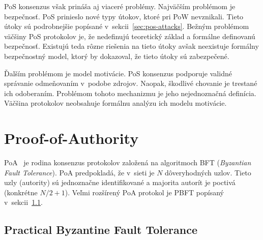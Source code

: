 PoS konsenzus však prináša aj viaceré problémy. Najväčším problémom je bezpečnosť. PoS prinieslo nové typy útokov, ktoré pri PoW nevznikali. Tieto útoky sú podrobnejšie popísané v~sekcii~\ref{sec:pos-attacks}. Bežným problémom väčšiny PoS protokolov je, že nedefinujú teoretický základ a formálne definovanú bezpečnosť. Existujú teda rôzne riešenia na tieto útoky avšak neexistuje formálny bezpečnostný model, ktorý by dokazoval, že tieto útoky sú zabezpečené.

Ďalším problémom je model motivácie. PoS konsenzus podporuje validné správanie odmeňovaním v~podobe zdrojov. Naopak, škodlivé chovanie je trestané ich odoberaním. Problémom tohoto mechanizmu je jeho nejednoznačná definícia. Väčšina protokolov neobsahuje formálnu analýzu ich modelu motivácie.~\cite{nguyenPos}

\section{Proof-of-Authority}

PoA~\cite{Angelis2018PBFTVP} je rodina konsenzus protokolov založená na algoritmoch BFT (\textit{Byzantian Fault Tolerance}). PoA predpokladá, že v~sieti je $N$ dôveryhodných uzlov. Tieto uzly (autority) sú jednoznačne identifikované  a majorita autorít je poctivá (konkrétne $N/2 + 1$). Veľmi rozšírený PoA protokol je PBFT popísaný v~sekcii~\ref{subsec:pos-pbft}.

\subsection{Practical Byzantine Fault Tolerance}\label{subsec:pos-pbft}

